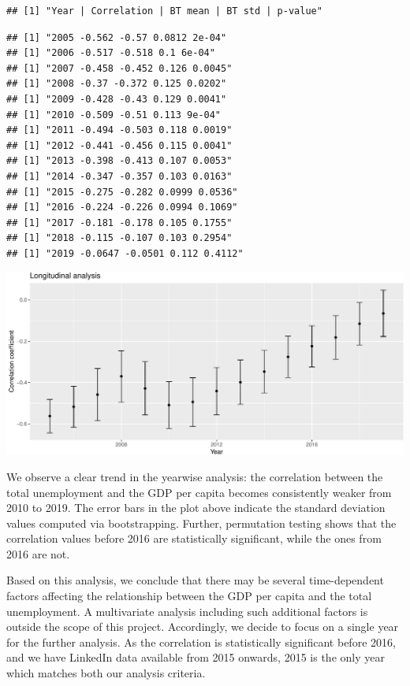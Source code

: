\documentclass[
]{article}
\begin{document}
\begin{verbatim}
## [1] "Year | Correlation | BT mean | BT std | p-value"
\end{verbatim}

\begin{verbatim}
## [1] "2005 -0.562 -0.57 0.0812 2e-04"
## [1] "2006 -0.517 -0.518 0.1 6e-04"
## [1] "2007 -0.458 -0.452 0.126 0.0045"
## [1] "2008 -0.37 -0.372 0.125 0.0202"
## [1] "2009 -0.428 -0.43 0.129 0.0041"
## [1] "2010 -0.509 -0.51 0.113 9e-04"
## [1] "2011 -0.494 -0.503 0.118 0.0019"
## [1] "2012 -0.441 -0.456 0.115 0.0041"
## [1] "2013 -0.398 -0.413 0.107 0.0053"
## [1] "2014 -0.347 -0.357 0.103 0.0163"
## [1] "2015 -0.275 -0.282 0.0999 0.0536"
## [1] "2016 -0.224 -0.226 0.0994 0.1069"
## [1] "2017 -0.181 -0.178 0.105 0.1755"
## [1] "2018 -0.115 -0.107 0.103 0.2954"
## [1] "2019 -0.0647 -0.0501 0.112 0.4112"
\end{verbatim}

\includegraphics{main_files/figure-latex/correlation_one_year-1.pdf}

We observe a clear trend in the yearwise analysis: the correlation
between the total unemployment and the GDP per capita becomes
consistently weaker from 2010 to 2019. The error bars in the plot above
indicate the standard deviation values computed via bootstrapping.
Further, permutation testing shows that the correlation values before
2016 are statistically significant, while the ones from 2016 are not.

Based on this analysis, we conclude that there may be several
time-dependent factors affecting the relationship between the GDP per
capita and the total unemployment. A multivariate analysis including
such additional factors is outside the scope of this project.
Accordingly, we decide to focus on a single year for the further
analysis. As the correlation is statistically significant before 2016,
and we have LinkedIn data available from 2015 onwards, 2015 is the only
year which matches both our analysis criteria.
\end{document}
